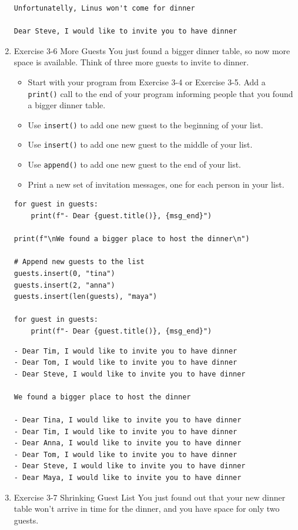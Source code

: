 \documentclass[10pt]{book}
\begin{document}
\begin{enumerate}
\begin{verbatim}
Unfortunatelly, Linus won't come for dinner

Dear Steve, I would like to invite you to have dinner
\end{verbatim}
\item Exercise 3-6 More Guests
\label{sec:orgf662456}
You just found a bigger dinner table, so now more space is available. Think of three more guests to invite to dinner.
\begin{itemize}
\item Start with your program from Exercise 3-4 or Exercise 3-5. Add a \texttt{print()} call to the end of your program informing people that you found a bigger dinner table.
\item Use \texttt{insert()} to add one new guest to the beginning of your list.
\item Use \texttt{insert()} to add one new guest to the middle of your list.
\item Use \texttt{append()} to add one new guest to the end of your list.
\item Print a new set of invitation messages, one for each person in your list.
\end{itemize}

\begin{verbatim}
for guest in guests:
    print(f"- Dear {guest.title()}, {msg_end}")

print(f"\nWe found a bigger place to host the dinner\n")

# Append new guests to the list
guests.insert(0, "tina")
guests.insert(2, "anna")
guests.insert(len(guests), "maya")

for guest in guests:
    print(f"- Dear {guest.title()}, {msg_end}")
\end{verbatim}

\label{orgee6af42}
\begin{verbatim}
- Dear Tim, I would like to invite you to have dinner
- Dear Tom, I would like to invite you to have dinner
- Dear Steve, I would like to invite you to have dinner

We found a bigger place to host the dinner

- Dear Tina, I would like to invite you to have dinner
- Dear Tim, I would like to invite you to have dinner
- Dear Anna, I would like to invite you to have dinner
- Dear Tom, I would like to invite you to have dinner
- Dear Steve, I would like to invite you to have dinner
- Dear Maya, I would like to invite you to have dinner
\end{verbatim}
\item Exercise 3-7  Shrinking Guest List
\label{sec:org963e0f4}
You just found out that your new dinner table won’t arrive in time for the dinner, and you have space for only two guests.


\end{enumerate}
\end{document}
